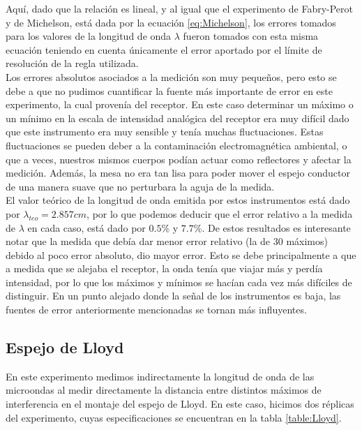 \documentclass[%
 reprint,
 amsmath,amssymb,
 aps,
]{revtex4-1}
\begin{document}
Aquí, dado que la relación es lineal, y al igual que el experimento de Fabry-Perot y de Michelson, está dada por la ecuación \ref{eq:Michelson}, los errores tomados para los valores de la longitud de onda $\lambda$ fueron tomados con esta misma ecuación teniendo en cuenta únicamente el error aportado por el límite de resolución de la regla utilizada.\\

Los errores absolutos asociados a la medición son muy  pequeños, pero esto se debe a que no pudimos cuantificar la fuente más importante de error en este experimento, la cual provenía del receptor. En este caso determinar un máximo o un mínimo en la escala de intensidad analógica del receptor era muy difícil dado que este instrumento era muy sensible y tenía muchas fluctuaciones. Estas fluctuaciones se pueden deber a la contaminación electromagnética ambiental, o que a veces, nuestros mismos cuerpos podían actuar como reflectores y afectar la medición. Además, la mesa no era tan lisa para poder mover el espejo conductor de una manera suave que no perturbara la aguja de la medida.\\

El valor teórico de la longitud de onda emitida por estos instrumentos está dado por $\lambda_{teo} = 2.857 cm$, por lo que podemos deducir que el error relativo a la medida de $\lambda$ en cada caso, está dado por $0.5\%$ y $7.7\%$. De estos resultados es interesante notar que la medida que debía dar menor error relativo (la de 30 máximos) debido al poco error absoluto, dio mayor error. Esto se debe principalmente a que a medida que se alejaba el receptor, la onda tenía que viajar más y perdía intensidad, por lo que los máximos y mínimos se hacían cada vez más difíciles de distinguir. En un punto alejado donde la señal de los instrumentos es baja, las fuentes de error anteriormente mencionadas se tornan más influyentes.\\

\subsection{\label{sec:level3}Espejo de Lloyd}
En este experimento medimos indirectamente la longitud de onda de las microondas al medir directamente la distancia entre distintos máximos de interferencia en el montaje del espejo de Lloyd. En este caso, hicimos dos réplicas del experimento, cuyas especificaciones se encuentran en la tabla \ref{table:Lloyd}.\\
\end{document}
